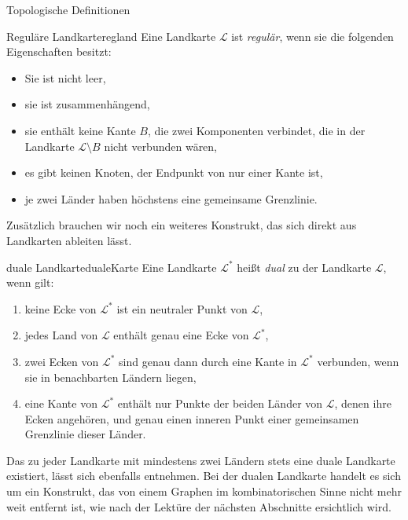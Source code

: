 \begin{section}{Topologische Definitionen}
 \begin{definitionl}{Reguläre Landkarte}{regland}
  Eine Landkarte $\mathcal{L}$ ist \textit{regulär}, wenn sie die folgenden Eigenschaften besitzt:
  \begin{itemize}
   \item Sie ist nicht leer,
   \item sie ist zusammenhängend,
   \item sie enthält keine Kante $B$, die zwei Komponenten verbindet, die in der Landkarte $\mathcal{L} \setminus B$ nicht verbunden wären,
   \item es gibt keinen Knoten, der Endpunkt von nur einer Kante ist,
   \item je zwei Länder haben höchstens eine gemeinsame Grenzlinie.
  \end{itemize}
 \end{definitionl}
 
 Zusätzlich brauchen wir noch ein weiteres Konstrukt, das sich direkt aus Landkarten ableiten lässt.

 \begin{definitionl}{duale Landkarte}{dualeKarte}
  Eine Landkarte $\mathcal{L}^*$ heißt \textit{dual} zu der Landkarte $\mathcal{L}$, wenn gilt:
  \begin{enumerate}
   \item keine Ecke von $\mathcal{L}^*$ ist ein neutraler Punkt von $\mathcal{L}$,
   \item jedes Land von $\mathcal{L}$ enthält genau eine Ecke von $\mathcal{L}^*$,
   \item zwei Ecken von $\mathcal{L}^*$ sind genau dann durch eine Kante in $\mathcal{L}^*$ verbunden, wenn sie in benachbarten Ländern liegen,
   \item eine Kante von $\mathcal{L}^*$ enthält nur Punkte der beiden Länder von $\mathcal{L}$, denen ihre Ecken angehören, und genau einen inneren Punkt einer gemeinsamen Grenzlinie dieser Länder.
  \end{enumerate}
 \end{definitionl}
 
 Das zu jeder Landkarte mit mindestens zwei Ländern stets eine duale Landkarte existiert, lässt sich ebenfalls \cite{fritsch} entnehmen. Bei der dualen Landkarte handelt es sich um ein Konstrukt, das von einem Graphen im kombinatorischen Sinne nicht mehr weit entfernt ist, wie nach der Lektüre der nächsten Abschnitte ersichtlich wird.
\end{section}